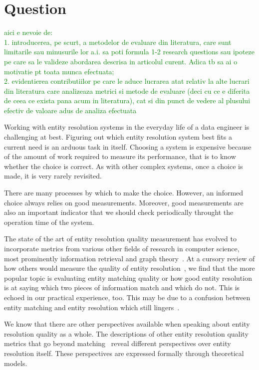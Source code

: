 \documentclass[journal]{IEEEtran}
\begin{document}
    \section{Question}\label{sec:contributions}

    \textcolor{green}{aici e nevoie de:\\
    1. introducerea, pe scurt, a metodelor de evaluare din literatura, care sunt limitarile sau minusurile lor a.i. sa poti formula 1-2 research questions sau ipoteze pe care sa le valideze abordarea descrisa in articolul curent. Adica tb sa ai o motivatie pt toata munca efectuata;\\
    2. evidentierea contributiilor pe care le aduce lucrarea atat relativ la alte lucrari din literatura care analizeaza metrici si metode de evaluare (deci cu ce e diferita de ceea ce exista pana acum in literatura), cat si din punct de vedere al plusului efectiv de valoare adus de analiza efectuata}

    Working with entity resolution systems in the everyday life of a data
    engineer is challenging at best.
    Figuring out which entity resolution system best fits a current need is an
    arduous task in itself.
    Choosing a system is expensive because of the amount of work required to
    measure its performance, that is to know whether the choice is correct.
    As with other complex systems, once a choice is made, it is very rarely
    revisited.

    There are many processes by which to make the choice.
    However, an informed choice always relies on good measurements.
    Moreover, good measurements are also an important indicator that we should
    check periodically throught the operation time of the system.

    The state of the art of entity resolution quality measurement has evolved to
    incorporate metrics from various other fields of research in computer
    science, most prominently information retrieval and graph
    theory~\cite{hitesh2012}.
    At a cursory review of how others would measure the quality of entity
    resolution~\cite{fever2009,Pap19,Goga2015}, we find that the more popular
    topic is evaluating entity matching quality or how good entity resolution
    is at saying which two pieces of information match and which do not.
    This is echoed in our practical experience, too.
    This may be due to a confusion between entity matching and entity resolution
    which still lingers~\cite{Tal11}.

    We know that there are other perspectives available when speaking about
    entity resolution quality as a whole.
    The descriptions of other entity resolution quality metrics that go beyond
    matching~\cite{Men10,tal2007algebraic} reveal different perspectives over
    entity resolution itself.
    These perspectives are expressed formally through theoretical models.
    
\end{document}
